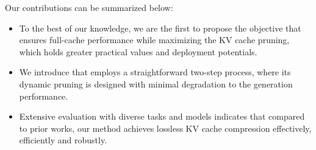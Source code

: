 Our contributions can be summarized below:
\begin{itemize}[noitemsep,nolistsep,leftmargin=*]
\item To the best of our knowledge, we are the first to propose the objective that ensures full-cache performance while maximizing the KV cache pruning, which holds greater practical values and deployment potentials.
\item We introduce \method that employs a straightforward two-step process, where its dynamic pruning is designed with minimal degradation to the generation performance.
\item Extensive evaluation with diverse tasks and models indicates that compared to prior works, our method achieves lossless KV cache compression effectively, efficiently and robustly.
\end{itemize}